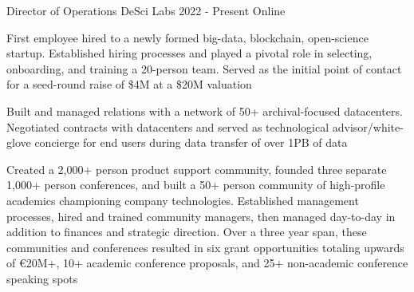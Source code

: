 
\begin{cventries}

  \cventry
    {Director of Operations} %
    {DeSci Labs} %
    {2022 - Present} %
    {Online} %
    {
      \begin{cvitems} %
        \item {First employee hired to a newly formed big-data, blockchain, open-science startup. Established hiring processes and played a pivotal role in selecting, onboarding, and training a 20-person team. Served as the initial point of contact for a seed-round raise of \$4M at a \$20M valuation}
        \item {Built and managed relations with a network of 50+ archival-focused datacenters. Negotiated contracts with datacenters and served as technological advisor/white-glove concierge for end users during data transfer of over 1PB of data}  
        \item {Created a 2,000+ person product support community, founded three separate 1,000+ person conferences, and built a 50+ person community of high-profile academics championing company technologies. Established management processes, hired and trained community managers, then managed day-to-day in addition to finances and strategic direction. Over a three year span, these communities and conferences resulted in six grant opportunities totaling upwards of €20M+, 10+ academic conference proposals, and 25+ non-academic conference speaking spots}
      \end{cvitems}
    }


\end{cventries}
